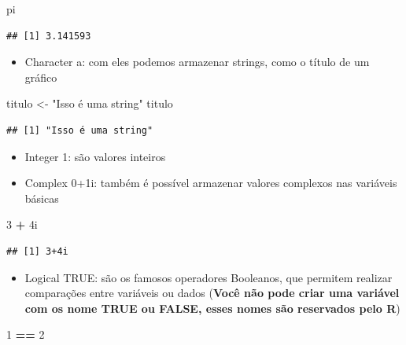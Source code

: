 \documentclass[]{book}
\newenvironment{Shaded}{\begin{snugshade}}{\end{snugshade}}
\newcommand{\DecValTok}[1]{\textcolor[rgb]{0.00,0.00,0.81}{#1}}
\newcommand{\StringTok}[1]{\textcolor[rgb]{0.31,0.60,0.02}{#1}}
\newcommand{\OperatorTok}[1]{\textcolor[rgb]{0.81,0.36,0.00}{\textbf{#1}}}
\newcommand{\NormalTok}[1]{#1}
\providecommand{\tightlist}{%
  \setlength{\itemsep}{0pt}\setlength{\parskip}{0pt}}
\theoremstyle{definition}
\theoremstyle{definition}
\theoremstyle{definition}
\theoremstyle{remark}
\begin{document}
\begin{Shaded}
\begin{Highlighting}[]
\NormalTok{pi}
\end{Highlighting}
\end{Shaded}

\begin{verbatim}
## [1] 3.141593
\end{verbatim}

\begin{itemize}
\tightlist
\item
  Character a: com eles podemos armazenar strings, como o título de um
  gráfico
\end{itemize}

\begin{Shaded}
\begin{Highlighting}[]
\NormalTok{titulo <-}\StringTok{ "Isso é uma string"}
\NormalTok{titulo}
\end{Highlighting}
\end{Shaded}

\begin{verbatim}
## [1] "Isso é uma string"
\end{verbatim}

\begin{itemize}
\item
  Integer 1: são valores inteiros
\item
  Complex 0+1i: também é possível armazenar valores complexos nas
  variáveis básicas
\end{itemize}

\begin{Shaded}
\begin{Highlighting}[]
\DecValTok{3} \OperatorTok{+}\StringTok{ }\NormalTok{4i}
\end{Highlighting}
\end{Shaded}

\begin{verbatim}
## [1] 3+4i
\end{verbatim}

\begin{itemize}
\tightlist
\item
  Logical TRUE: são os famosos operadores Booleanos, que permitem
  realizar comparações entre variáveis ou dados (\textbf{Você não pode
  criar uma variável com os nome TRUE ou FALSE, esses nomes são
  reservados pelo R})
\end{itemize}

\begin{Shaded}
\begin{Highlighting}[]
\DecValTok{1} \OperatorTok{==}\StringTok{ }\DecValTok{2}
\end{Highlighting}
\end{Shaded}
\end{document}
